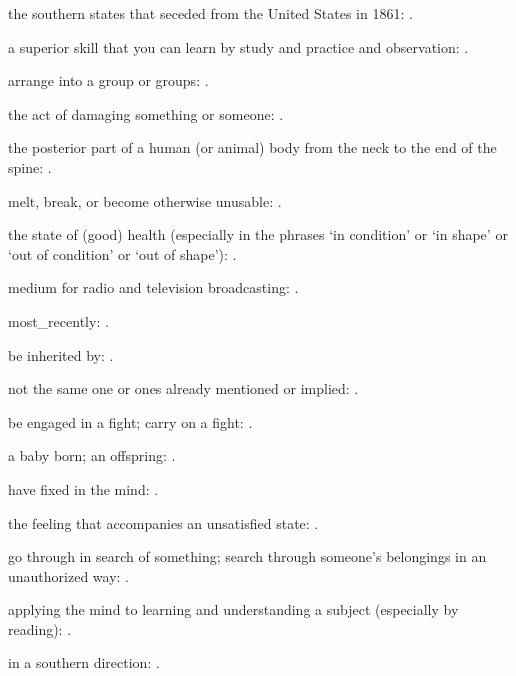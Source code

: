   the southern states that seceded from the United States in 1861:   .

  a superior skill that you can learn by study and practice and observation:   .

  arrange into a group or groups: .

  the act of damaging something or someone: .

  the posterior part of a human (or animal) body from the neck to the end of the spine:   .

  melt, break, or become otherwise unusable:   .

  the state of (good) health (especially in the phrases `in condition' or `in shape' or `out of condition' or `out of shape'):   .

  medium for radio and television broadcasting:   .

  most\_recently: .

  be inherited by:   .

  not the same one or ones already mentioned or implied: .

  be engaged in a fight; carry on a fight: .

  a baby born; an offspring: .

  have fixed in the mind: .

  the feeling that accompanies an unsatisfied state: .

  go through in search of something; search through someone's belongings in an unauthorized way:   .

  applying the mind to learning and understanding a subject (especially by reading):   .

  in a southern direction:   .

